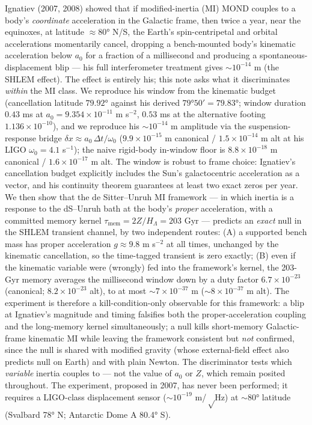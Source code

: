 \documentclass[
]{article}
\begin{document}
Ignatiev (2007, 2008) showed that if modified-inertia (MI) MOND couples
to a body's \emph{coordinate} acceleration in the Galactic frame, then
twice a year, near the equinoxes, at latitude \(\approx 80°\) N/S, the
Earth's spin-centripetal and orbital accelerations momentarily cancel,
dropping a bench-mounted body's kinematic acceleration below \(a_0\) for
a fraction of a millisecond and producing a spontaneous-displacement
blip --- his full interferometer treatment gives \(\sim 10^{-14}\) m
(the SHLEM effect). The effect is entirely his; this note asks what it
discriminates \emph{within} the MI class. We reproduce his window from
the kinematic budget (cancellation latitude \(79.92°\) against his
derived \(79°50' = 79.83°\); window duration \(0.43\) ms at
\(a_0 = 9.354\times10^{-11}\) m s\(^{-2}\), \(0.53\) ms at the
alternative footing \(1.136\times10^{-10}\)), and we reproduce his
\(\sim10^{-14}\) m amplitude via the suspension-response bridge
\(\delta x \approx a_0\,\Delta t/\omega_0\) (\(9.9\times10^{-15}\) m
canonical / \(1.5\times10^{-14}\) m alt at his LIGO \(\omega_0 = 4.1\)
s\(^{-1}\)); the naive rigid-body in-window floor is
\(8.8\times10^{-18}\) m canonical / \(1.6\times10^{-17}\) m alt. The
window is robust to frame choice: Ignatiev's cancellation budget
explicitly includes the Sun's galactocentric acceleration as a vector,
and his continuity theorem guarantees at least two exact zeros per year.
We then show that the de Sitter--Unruh MI framework --- in which inertia
is a response to the dS--Unruh bath at the body's \emph{proper}
acceleration, with a committed memory kernel
\(\tau_\mathrm{mem}=2Z/H_\Lambda = 203\) Gyr --- predicts an \emph{exact}
null in the SHLEM transient channel, by two independent routes: (A) a
supported bench mass has proper acceleration \(g \approx 9.8\) m
s\(^{-2}\) at all times, unchanged by the kinematic cancellation, so the
time-tagged transient is zero exactly; (B) even if the kinematic
variable were (wrongly) fed into the framework's kernel, the 203-Gyr
memory averages the millisecond window down by a duty factor
\(6.7\times10^{-23}\) (canonical; \(8.2\times10^{-23}\) alt), to at most
\(\sim 7\times10^{-37}\) m (\(\sim 8\times10^{-37}\) m alt). The
experiment is therefore a kill-condition-only observable for this
framework: a blip at Ignatiev's magnitude and timing falsifies both the
proper-acceleration coupling and the long-memory kernel simultaneously;
a null kills short-memory Galactic-frame kinematic MI while leaving the
framework consistent but \emph{not} confirmed, since the null is shared
with modified gravity (whose external-field effect also predicts null on
Earth) and with plain Newton. The discriminator tests which
\emph{variable} inertia couples to --- not the value of \(a_0\) or
\(Z\), which remain posited throughout. The experiment, proposed in
2007, has never been performed; it requires a LIGO-class displacement
sensor (\(\sim10^{-19}\) m/\(\sqrt\mathrm{Hz}\)) at \(\sim80°\) latitude
(Svalbard 78° N; Antarctic Dome A 80.4° S).
\end{document}
